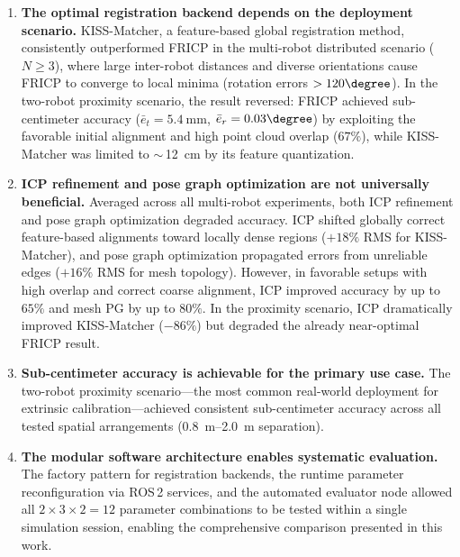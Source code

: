 \begin{enumerate}
    \item \textbf{The optimal registration backend depends on the
          deployment scenario.}
          KISS-Matcher, a feature-based global registration method,
          consistently outperformed FRICP in the multi-robot distributed
          scenario ($N \geq 3$), where large inter-robot distances and
          diverse orientations cause FRICP to converge to local minima
          (rotation errors $> 120\degree$).
          In the two-robot proximity scenario, the result reversed:
          FRICP achieved sub-centimeter accuracy
          ($\bar{e}_t = \SI{5.4}{\milli\metre}$, $\bar{e}_r =
          0.03\degree$) by exploiting the favorable initial alignment
          and high point cloud overlap ($67\%$), while KISS-Matcher was
          limited to $\sim$\,\SI{12}{\centi\metre} by its feature
          quantization.

    \item \textbf{ICP refinement and pose graph optimization are not
          universally beneficial.}
          Averaged across all multi-robot experiments, both ICP
          refinement and pose graph optimization degraded accuracy.
          ICP shifted globally correct feature-based alignments toward
          locally dense regions ($+18\%$ RMS for KISS-Matcher), and
          pose graph optimization propagated errors from unreliable
          edges ($+16\%$ RMS for mesh topology).
          However, in favorable setups with high overlap and correct
          coarse alignment, ICP improved accuracy by up to $65\%$ and
          mesh PG by up to $80\%$.
          In the proximity scenario, ICP dramatically improved
          KISS-Matcher ($-86\%$) but degraded the already near-optimal
          FRICP result.

    \item \textbf{Sub-centimeter accuracy is achievable for the primary
          use case.}
          The two-robot proximity scenario---the most common real-world
          deployment for extrinsic calibration---achieved consistent
          sub-centimeter accuracy across all tested spatial arrangements
          (\SIrange{0.8}{2.0}{\metre} separation).

    \item \textbf{The modular software architecture enables systematic
          evaluation.}
          The factory pattern for registration backends, the runtime
          parameter reconfiguration via ROS\,2 services, and the
          automated evaluator node allowed all $2 \times 3 \times 2 = 12$
          parameter combinations to be tested within a single simulation
          session, enabling the comprehensive comparison presented in
          this work.
\end{enumerate}


